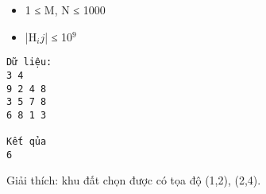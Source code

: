 \begin{itemize}
	\item 1 ≤ M, N ≤ 1000
	\item |H$_ij$| ≤ 10$^9$
\end{itemize}
\begin{verbatim}
Dữ liệu:
3 4
9 2 4 8
3 5 7 8
6 8 1 3

Kết qủa
6
\end{verbatim}

Giải thích: khu đất chọn được có tọa độ (1,2), (2,4).